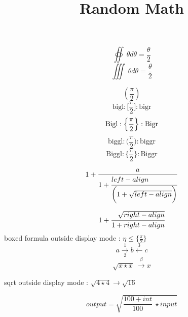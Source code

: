 \documentclass{article}
\title{Random Math}
\begin{document}
\maketitle
$$\oiint ~\theta{}d\theta = \frac{\theta}{2}$$
$$\iiint ~\theta{}d\theta = \frac{\theta}{2}$$

$$(\frac{\pi}{2})$$
$$\textrm{bigl} : \bigl[ \frac{\pi}{2} \bigr] : \textrm{bigr}$$
$$\textrm{Bigl} : \Bigl\{ \frac{\pi}{2}\Bigr\} : \textrm{Bigr}$$
$$\textrm{biggl} : \biggl( \frac{\pi}{2}\biggr) : \textrm{biggr}$$
$$\textrm{Biggl} : \Biggl\{ \frac{\pi}{2} \Biggr\} : \textrm{Biggr}$$

$$1+\frac{a}{1+\cfrac[l]{left-align}{\biggl(1 + \sqrt{left-align}\biggr)}}$$

$$1+\cfrac[r]{\sqrt{right-align}}{1 + right-align}$$
boxed formula outside display mode : $\boxed{\eta \leq \bigl\{\frac{\pi}{2}\bigr\}}$
$$a \xrightarrow[2]{1} b \xleftarrow{3} c$$
$$\sqrt{x \star x}~\xrightarrow{\beta} x$$

sqrt outside display mode : $\sqrt{4 \star 4}\rightarrow\sqrt{16}$

$$output = \sqrt{\frac{100+int}{100} ~\star input}$$

\end{document}
